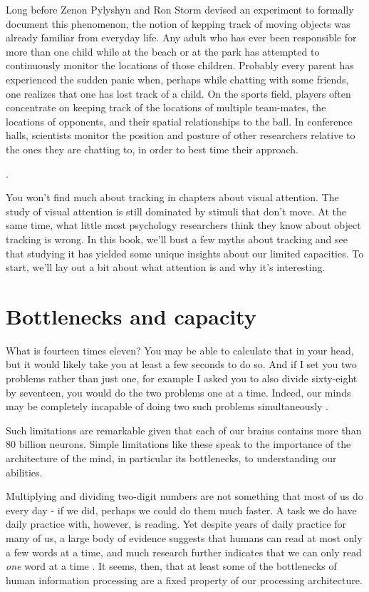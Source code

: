 \documentclass[
]{book}
\begin{document}
Long before Zenon Pylyshyn and Ron Storm devised an experiment to formally document this phenomenon, the notion of kepping track of moving objects was already familiar from everyday life. Any adult who has ever been responsible for more than one child while at the beach or at the park has attempted to continuously monitor the locations of those children. Probably every parent has experienced the sudden panic when, perhaps while chatting with some friends, one realizes that one has lost track of a child. On the sports field, players often concentrate on keeping track of the locations of multiple team-mates, the locations of opponents, and their spatial relationships to the ball. In conference halls, scientists monitor the position and posture of other researchers relative to the ones they are chatting to, in order to best time their approach.

.

You won't find much about tracking in chapters about visual attention. The study of visual attention is still dominated by stimuli that don't move. At the same time, what little most psychology researchers think they know about object tracking is wrong. In this book, we'll bust a few myths about tracking and see that studying it has yielded some unique insights about our limited capacities. To start, we'll lay out a bit about what attention is and why it's interesting.

\hypertarget{bottlenecks}{%
\chapter{Bottlenecks and capacity}\label{bottlenecks}}

What is fourteen times eleven? You may be able to calculate that in your head, but it would likely take you at least a few seconds to do so. And if I set you two problems rather than just one, for example I asked you to also divide sixty-eight by seventeen, you would do the two problems one at a time. Indeed, our minds may be completely incapable of doing two such problems simultaneously \citep{oberauerAccessInformationWorking2002, zylberbergBrainRouterCortical2010a}.

Such limitations are remarkable given that each of our brains contains more than 80 billion neurons. Simple limitations like these speak to the importance of the architecture of the mind, in particular its bottlenecks, to understanding our abilities.

Multiplying and dividing two-digit numbers are not something that most of us do every day - if we did, perhaps we could do them much faster. A task we do have daily practice with, however, is reading. Yet despite years of daily practice for many of us, a large body of evidence suggests that humans can read at most only a few words at a time, and much research further indicates that we can only read \emph{one} word at a time \citep{whiteEvidenceSerialProcessing2018, reichleEncodingMultipleWords2009}. It seems, then, that at least some of the bottlenecks of human information processing are a fixed property of our processing architecture.
\end{document}
